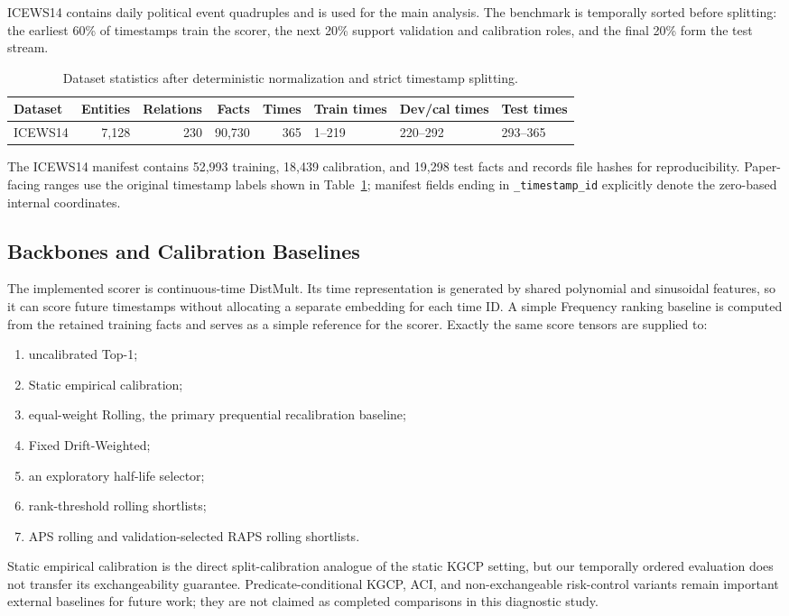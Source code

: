 \documentclass[information,article,submit,oneauthor,pdftex]{Definitions/mdpi}
\begin{document}
ICEWS14 contains daily political event quadruples and is used for the
main analysis. The benchmark is temporally sorted before splitting:
the earliest 60\% of timestamps train the scorer, the next 20\% support
validation and calibration roles, and the final 20\% form the test stream.

\begin{table}[t]
\centering
\caption{Dataset statistics after deterministic normalization and strict
timestamp splitting.}
\label{tab:datasets}
\begin{tabular}{lrrrrlll}
\toprule
Dataset & Entities & Relations & Facts & Times & Train times & Dev/cal times & Test times\\
\midrule
ICEWS14 & 7,128 & 230 & 90,730 & 365 & 1--219 & 220--292 & 293--365\\
\bottomrule
\end{tabular}
\end{table}

The ICEWS14 manifest contains 52,993 training, 18,439 calibration, and 19,298
test facts and records file hashes for reproducibility. Paper-facing ranges use
the original timestamp labels shown in Table~\ref{tab:datasets}; manifest
fields ending in \texttt{\_timestamp\_id} explicitly denote the zero-based
internal coordinates.

\subsection{Backbones and Calibration Baselines}

The implemented scorer is continuous-time DistMult. Its time representation is
generated by shared polynomial and sinusoidal features, so it can score future
timestamps without allocating a separate embedding for each time ID. A simple
Frequency ranking baseline is computed from the retained training facts and
serves as a simple reference for the scorer. Exactly the same score tensors are
supplied to:
\begin{enumerate}[leftmargin=*]
  \item uncalibrated Top-1;
  \item Static empirical calibration;
  \item equal-weight Rolling, the primary prequential recalibration baseline;
  \item Fixed Drift-Weighted;
  \item an exploratory half-life selector;
  \item rank-threshold rolling shortlists;
  \item APS rolling and validation-selected RAPS rolling shortlists.
\end{enumerate}
Static empirical calibration is the direct split-calibration analogue of the
static KGCP setting, but our temporally ordered evaluation does not transfer its
exchangeability guarantee. Predicate-conditional KGCP, ACI, and
non-exchangeable risk-control variants remain important external baselines for
future work; they are not claimed as completed comparisons in this diagnostic
study.
\end{document}
